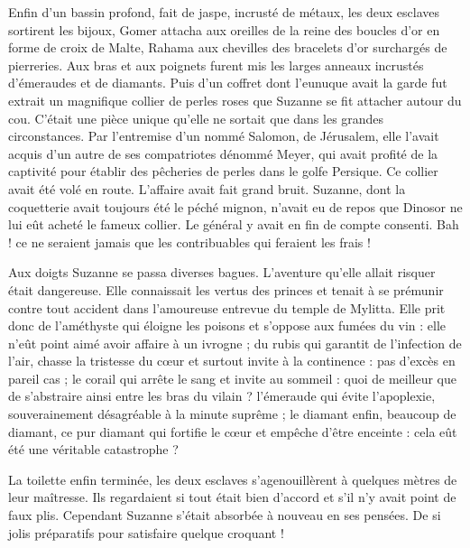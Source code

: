 \documentclass[a4paper, 11pt, oneside, polutonikogreek, french]{article}
\begin{document}
\bigskip
\centerline{\EightStarTaper}
\centerline{\EightStarTaper\EightStarTaper}
\bigskip

Enfin d'un bassin profond, fait de jaspe, incrusté de métaux, les deux esclaves sortirent les bijoux, Gomer attacha aux oreilles de la reine des boucles d'or en forme de croix de Malte, Rahama aux chevilles des bracelets d'or surchargés de pierreries. Aux bras et aux poignets furent mis les larges anneaux incrustés d'émeraudes et de diamants. Puis d'un coffret dont l'eunuque avait la garde fut extrait un magnifique collier de perles roses que Suzanne se fit attacher autour du cou. C'était une pièce unique qu'elle ne sortait que dans les grandes circonstances. Par l'entremise d'un nommé Salomon, de Jérusalem, elle l'avait acquis d'un autre de ses compatriotes dénommé Meyer, qui avait profité de la captivité pour établir des pêcheries de perles dans le golfe Persique. Ce collier avait été volé en route. L'affaire avait fait grand bruit. Suzanne, dont la coquetterie avait toujours été le péché mignon, n'avait eu de repos que Dinosor ne lui eût acheté le fameux collier. Le général y avait en fin de compte consenti. Bah ! ce ne seraient jamais que les contribuables qui feraient les frais !

\bigskip
\centerline{\EightStarTaper}
\centerline{\EightStarTaper\EightStarTaper}
\bigskip

Aux doigts Suzanne se passa diverses bagues. L'aventure qu'elle allait risquer était dangereuse. Elle connaissait les vertus des princes et tenait à se prémunir contre tout accident dans l'amoureuse entrevue du temple de Mylitta. Elle prit donc de l'améthyste qui éloigne les poisons et s'oppose aux fumées du vin : elle n'eût point aimé avoir affaire à un ivrogne ; du rubis qui garantit de l'infection de l'air, chasse la tristesse du cœur et surtout invite à la continence : pas d'excès en pareil cas ; le corail qui arrête le sang et invite au sommeil : quoi de meilleur que de s'abstraire ainsi entre les bras du vilain ? l'émeraude qui évite l'apoplexie, souverainement désagréable à la minute suprême ; le diamant enfin, beaucoup de diamant, ce pur diamant qui fortifie le cœur et empêche d'être enceinte : cela eût été une véritable catastrophe ?

\bigskip
\centerline{\EightStarTaper}
\centerline{\EightStarTaper\EightStarTaper}
\bigskip

La toilette enfin terminée, les deux esclaves s'agenouillèrent à quelques mètres de leur maîtresse. Ils regardaient si tout était bien d'accord et s'il n'y avait point de faux plis. Cependant Suzanne s'était absorbée à nouveau en ses pensées. De si jolis préparatifs pour satisfaire quelque croquant !
\end{document}
